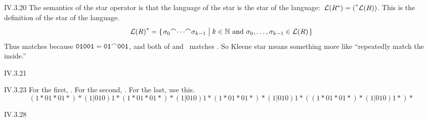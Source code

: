 %
%
%
%
\begin{ans}{IV.3.20}
The semantics of the star operator is that the language of the
star is the star of the language:~$\mathcal{L}({{R}^{*}})={{(}^{*}}\mathcal{L}(R))$.
This is the definition of the star of the language.
\begin{equation*}
\kleenestar{\lang(R)}
  =\set{\sigma_0\concat\cdots\concat\sigma_{k-1}\suchthat \text{$k\in\N$ and $\sigma_0,\ldots,\sigma_{k-1}\in\lang(R)$}}
\end{equation*}
Thus  matches  because
$\str{01001}=\str{01}\concat\str{001}$, and both of
 and~ matches .
So Kleene star means something more like
``repeatedly match the inside.''
\end{ans}
%
\begin{ans}{IV.3.21}
\begin{exparts}
\item {}
\item {}
\item {}
\item {}
\end{exparts}
\end{ans}
%
%
\begin{ans}{IV.3.23}
  For the first, .
  For the second, .
  For the last, use this.
  \begin{equation*}
    (1*01*01*)*(1|010)1*(1*01*01*)*(1|010)1*(1*01*01*)*(1|010)1*((1*01*01*)*(1|010)1*)*
  \end{equation*}
  
\end{ans}
%
%
%
%
%
\begin{ans}{IV.3.28}
\begin{exparts}
\item {}
\item {}
\item {}
\end{exparts}
\end{ans}
